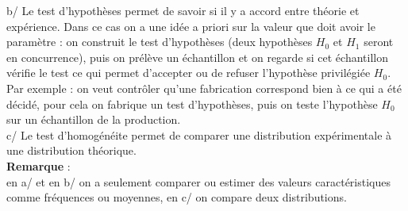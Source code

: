 \documentclass[a4paper,11pt]{book}
\begin{document}
b/ Le test d'hypoth\`eses permet de savoir si il y a accord entre th\'eorie et
 exp\'erience.
Dans ce cas on a une id\'ee a priori sur la valeur que doit avoir le
 param\`etre : on construit le test d'hypoth\`eses (deux hypoth\`eses $H_0$ et 
$H_1$ seront en concurrence), puis on pr\'el\`eve un 
\'echantillon et on regarde si cet \'echantillon v\'erifie le test ce qui 
permet d'accepter ou de refuser l'hypoth\`ese privil\'egi\'ee $H_0$.\\
Par exemple : on veut contr\^oler qu'une fabrication correspond 
bien \`a ce qui a \'et\'e d\'ecid\'e, pour cela on fabrique un test
d'hypoth\`eses, puis on teste l'hypoth\`ese $H_0$ sur un \'echantillon de la 
production.\\
c/ Le test d'homog\'en\'eite permet de comparer une distribution
exp\'erimentale \`a une distribution th\'eorique.\\
{\bf Remarque} :\\
 en a/ et en b/ on a seulement comparer ou estimer des valeurs 
caract\'eristiques comme fr\'equences ou moyennes, en c/ on compare deux 
distributions.

\end{document}
